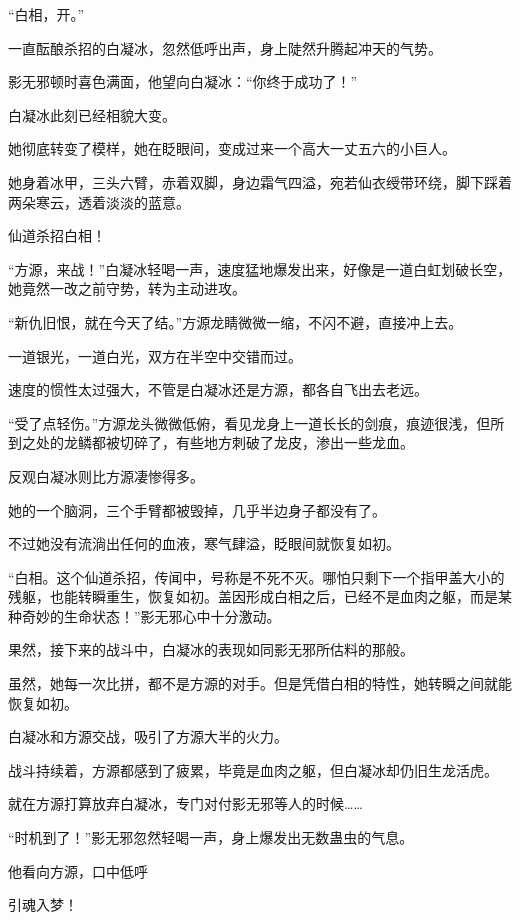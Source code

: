 \begin{this_body}
“白相，开。”

一直酝酿杀招的白凝冰，忽然低呼出声，身上陡然升腾起冲天的气势。

影无邪顿时喜色满面，他望向白凝冰：“你终于成功了！”

白凝冰此刻已经相貌大变。

她彻底转变了模样，她在眨眼间，变成过来一个高大一丈五六的小巨人。

她身着冰甲，三头六臂，赤着双脚，身边霜气四溢，宛若仙衣绶带环绕，脚下踩着两朵寒云，透着淡淡的蓝意。

仙道杀招白相！

“方源，来战！”白凝冰轻喝一声，速度猛地爆发出来，好像是一道白虹划破长空，她竟然一改之前守势，转为主动进攻。

“新仇旧恨，就在今天了结。”方源龙睛微微一缩，不闪不避，直接冲上去。

一道银光，一道白光，双方在半空中交错而过。

速度的惯性太过强大，不管是白凝冰还是方源，都各自飞出去老远。

“受了点轻伤。”方源龙头微微低俯，看见龙身上一道长长的剑痕，痕迹很浅，但所到之处的龙鳞都被切碎了，有些地方刺破了龙皮，渗出一些龙血。

反观白凝冰则比方源凄惨得多。

她的一个脑洞，三个手臂都被毁掉，几乎半边身子都没有了。

不过她没有流淌出任何的血液，寒气肆溢，眨眼间就恢复如初。

“白相。这个仙道杀招，传闻中，号称是不死不灭。哪怕只剩下一个指甲盖大小的残躯，也能转瞬重生，恢复如初。盖因形成白相之后，已经不是血肉之躯，而是某种奇妙的生命状态！”影无邪心中十分激动。

果然，接下来的战斗中，白凝冰的表现如同影无邪所估料的那般。

虽然，她每一次比拼，都不是方源的对手。但是凭借白相的特性，她转瞬之间就能恢复如初。

白凝冰和方源交战，吸引了方源大半的火力。

战斗持续着，方源都感到了疲累，毕竟是血肉之躯，但白凝冰却仍旧生龙活虎。

就在方源打算放弃白凝冰，专门对付影无邪等人的时候……

“时机到了！”影无邪忽然轻喝一声，身上爆发出无数蛊虫的气息。

他看向方源，口中低呼

引魂入梦！

\end{this_body}

